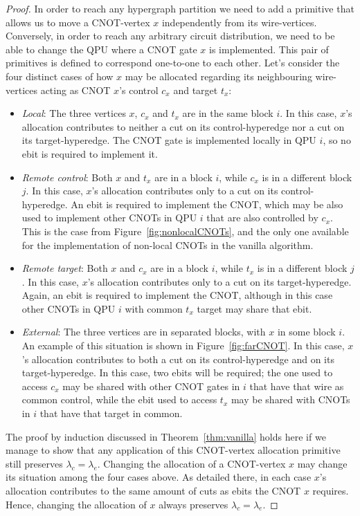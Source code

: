 \begin{proof}
In order to reach any hypergraph partition we need to add a primitive that allows us to move a CNOT-vertex \(x\) independently from its wire-vertices. Conversely, in order to reach any arbitrary circuit distribution, we need to be able to change the QPU where a CNOT gate \(x\) is implemented. This pair of primitives is defined to correspond one-to-one to each other. Let's consider the four distinct cases of how \(x\) may be allocated regarding its neighbouring wire-vertices acting as CNOT \(x\)'s control \(c_x\) and target \(t_x\):
\begin{itemize}
  \item \textit{Local}: The three vertices \(x\), \(c_x\) and \(t_x\) are in the same block \(i\). In this case, \(x\)'s allocation contributes to neither a cut on its control-hyperedge nor a cut on its target-hyperedge. The CNOT gate is implemented locally in QPU \(i\), so no ebit is required to implement it.
  \item \textit{Remote control}: Both \(x\) and \(t_x\) are in a block \(i\), while \(c_x\) is in a different block \(j\). In this case, \(x\)'s allocation contributes only to a cut on its control-hyperedge. An ebit is required to implement the CNOT, which may be also used to implement other CNOTs in QPU \(i\) that are also controlled by \(c_x\). This is the case from Figure~\ref{fig:nonlocalCNOTs}, and the only one available for the implementation of non-local CNOTs in the vanilla algorithm.
  \item \textit{Remote target}: Both \(x\) and \(c_x\) are in a block \(i\), while \(t_x\) is in a different block \(j\). In this case, \(x\)'s allocation contributes only to a cut on its target-hyperedge. Again, an ebit is required to implement the CNOT, although in this case other CNOTs in QPU \(i\) with common \(t_x\) target may share that ebit.
  \item \textit{External}: The three vertices are in separated blocks, with \(x\) in some block \(i\). An example of this situation is shown in Figure~\ref{fig:farCNOT}. In this case, \(x\)'s allocation contributes to both a cut on its control-hyperedge and on its target-hyperedge. In this case, two ebits will be required; the one used to access \(c_x\) may be shared with other CNOT gates in \(i\) that have that wire as common control, while the ebit used to access \(t_x\) may be shared with CNOTs in \(i\) that have that target in common.
\end{itemize} 

The proof by induction discussed in Theorem~\ref{thm:vanilla} holds here if we manage to show that any application of this CNOT-vertex allocation primitive still preserves \(\lambda_c = \lambda_e\). Changing the allocation of a CNOT-vertex \(x\) may change its situation among the four cases above. As detailed there, in each case \(x\)'s allocation contributes to the same amount of cuts as ebits the CNOT \(x\) requires. Hence, changing the allocation of \(x\) always preserves \(\lambda_c = \lambda_e\).

\end{proof}

